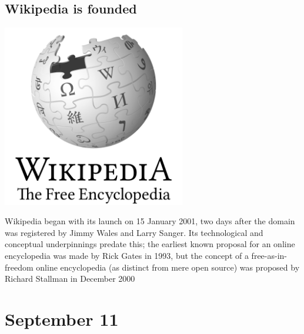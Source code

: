 \documentclass[11pt]{report}
\begin{document}
\subsection{Wikipedia is founded}
\vspace{2mm}\begin{center}\includegraphics[width=8cm]{./img/wikipedia.png}\end{center}
Wikipedia began with its launch on 15 January 2001, two days after the domain was registered by Jimmy Wales and Larry Sanger. Its technological and conceptual underpinnings predate this; the earliest known proposal for an online encyclopedia was made by Rick Gates in 1993, but the concept of a free-as-in-freedom online encyclopedia (as distinct from mere open source) was proposed by Richard Stallman in December 2000

\section{September 11}
\end{document}
